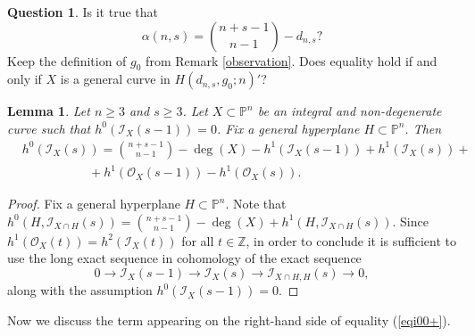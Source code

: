 \documentclass[a4, 11pt]{amsart}
\theoremstyle{plain}
\newtheorem{lemma}[theorem]{Lemma}
\theoremstyle{definition}
\newtheorem{question}[theorem]{Question}
\newcommand{\enm}[1]{\ensuremath{#1}}          %
\newcommand{\cal}[1]{\mathcal{#1}}
\newcommand{\PP}{\enm{\mathbb{P}}}
\newcommand{\Ii}{\enm{\cal{I}}}
\newcommand{\Oo}{\enm{\cal{O}}}
\renewcommand{\to}[1][]{\xrightarrow{\ #1\ }}
\begin{document}
\begin{question}\label{qw0}
Is it true that 
\[
\alpha (n,s) = \binom{n+s-1}{n-1} -d_{n,s}?
\] 
Keep the definition of $g_0$ from Remark \ref{observation}. Does equality hold if and only if $X$ is a general curve in $H(d_{n,s}, g_0; n)'$?
\end{question}


\begin{lemma}\label{i00+}
Let $n\ge 3$ and $s\ge3$. Let $X\subset \PP^n$ be an integral and non-degenerate curve such that $h^0(\Ii _X(s-1))  = 0$. Fix a general
hyperplane $H\subset \PP^n$.
Then 
\begin{align}\label{eqi00+} 
&
h^0(\Ii _X(s))  =  \binom{n+s-1}{n-1}-\deg (X)  -h^1(\Ii_X(s-1)) + h^1(\Ii _X(s))+ \\
& \nonumber
 \ \ \ \ \ \ \ \ \ \ \ \ \ \ \ \ \ \ \ \  \ \ \ \ + h^1(\Oo _X(s-1)) -h^1(\Oo _X(s)).
\end{align}
\end{lemma}

\begin{proof}
Fix a general hyperplane $H\subset \PP^n$. Note that $h^0(H,\Ii _{X\cap H}(s)) =\binom{n+s-1}{n-1}-\deg (X)+h^1(H,\Ii _{X\cap H}(s))$. Since $h^1(\Oo _X(t)) =h^2(\Ii _X(t))$ for all $t\in \mathbb Z$, in order to conclude it is sufficient to use the long exact sequence in cohomology of the exact sequence
\begin{equation}\label{eqi01}
0\to \Ii _X(s-1)\to \Ii _X(s)\to \Ii _{X\cap H,H}(s)\to 0, 
\end{equation}
along with the assumption $h^0(\Ii _X(s-1)) =0$.
\end{proof}

Now we discuss the term appearing on the right-hand side of equality (\ref{eqi00+}). 
\end{document}
